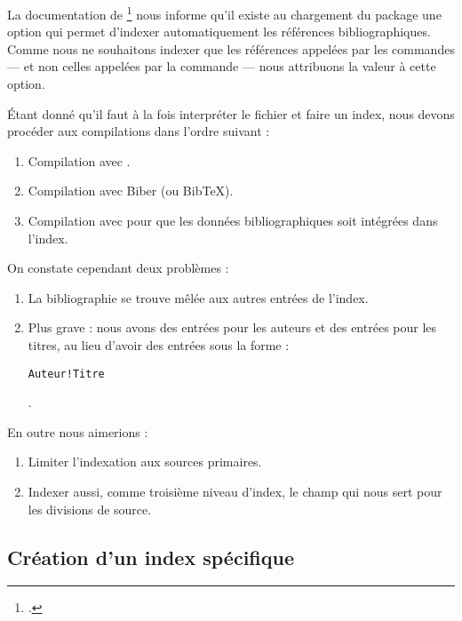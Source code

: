 La documentation de \footcite{biblatex_options} nous informe qu'il existe  au chargement du package une option  qui permet d'indexer automatiquement les références bibliographiques. Comme nous ne souhaitons indexer que les références appelées par les commandes   ---  et non celles appelées par la commande  --- nous attribuons la valeur  à cette option. 

\begin{latexcode}
\usepackage[indexing=cite]{biblatex}
\end{latexcode}

Étant donné qu'il faut à la fois interpréter le fichier  et faire un index, nous devons procéder aux compilations dans l'ordre suivant :

\begin{enumerate}
\item Compilation avec \XeLaTeX.
\item Compilation avec Biber (ou BibTeX).
\item Compilation avec \XeLaTeX pour que les données bibliographiques soit intégrées dans l'index.
\end{enumerate}

On constate cependant deux problèmes : 
\begin{enumerate}
\item La bibliographie se trouve mêlée aux autres entrées de l'index.
\item Plus grave : nous avons des entrées pour les auteurs et des entrées pour les titres, au lieu d'avoir des entrées sous la forme : 

\begin{english}\verb|Auteur!Titre|\end{english}.
\end{enumerate}

En outre nous aimerions :
\begin{enumerate}
\item Limiter l'indexation aux sources primaires.
\item Indexer aussi, comme troisième niveau d'index, le champ  qui nous sert pour les divisions de source. 
\end{enumerate}

\subsection{Création d'un index spécifique}

